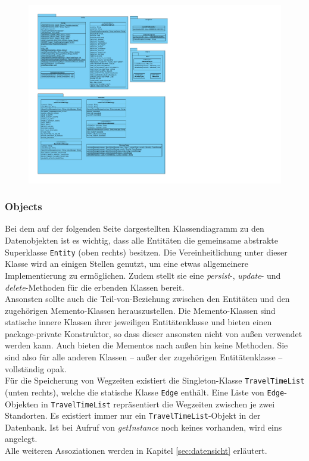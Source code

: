 \documentclass[fontsize=12pt,paper=a4,twoside]{scrartcl}
\begin{document}
\begin{figure}[H]
\includegraphics[width=\textwidth]{common.pdf}
\end{figure}
\newpage

\subsubsection{Objects}
\label{subsubsec:Objects}
Bei dem auf der folgenden Seite dargestellten Klassendiagramm zu den Datenobjekten ist es wichtig, dass alle Entitäten die gemeinsame abstrakte Superklasse \texttt{Entity} (oben rechts) besitzen. Die Vereinheitlichung unter dieser Klasse wird an einigen Stellen genutzt, um eine etwas allgemeinere Implementierung zu ermöglichen. Zudem stellt sie eine \textit{persist}-, \textit{update}- und \textit{delete}-Methoden für die erbenden Klassen bereit.\\
Ansonsten sollte auch die Teil-von-Beziehung zwischen den Entitäten und den zugehörigen Memento-Klassen herauszustellen. Die Memento-Klassen sind statische innere Klassen ihrer jeweiligen Entitätenklasse und bieten einen package-private Konstruktor, so dass dieser ansonsten nicht von außen verwendet werden kann. Auch bieten die Mementos nach außen hin keine Methoden. Sie sind also für alle anderen Klassen -- außer der zugehörigen Entitätenklasse -- vollständig opak.\\
Für die Speicherung von Wegzeiten existiert die Singleton-Klasse \texttt{TravelTimeList} (unten rechts), welche die statische Klasse \texttt{Edge} enthält. Eine Liste von \texttt{Edge}-Objekten in \texttt{TravelTimeList} repräsentiert die Wegzeiten zwischen je zwei Standorten. Es existiert immer nur ein \texttt{TravelTimeList}-Objekt in der Datenbank. Ist bei Aufruf von \textit{getInstance} noch keines vorhanden, wird eins angelegt.\\
Alle weiteren Assoziationen werden in Kapitel \ref{sec:datensicht} erläutert.
\end{document}

